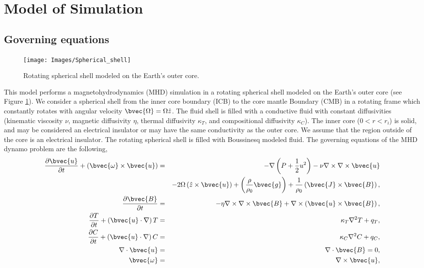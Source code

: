 \section{Model of Simulation}
\subsection{Governing equations}
%
\begin{figure}[htbp]
\begin{center}
\texttt{[image: Images/Spherical\_shell]}
\end{center}
\caption{Rotating spherical shell modeled on the Earth's outer core.}
\label{fig:shell}
\end{figure}
%
This model performs a magnetohydrodynamics (MHD) simulation in a rotating spherical shell modeled on the Earth's outer core (see Figure \ref{fig:shell}). We consider a spherical shell from the inner core boundary (ICB) to the core mantle Boundary (CMB) in a rotating frame which constantly rotates with angular velocity $\bvec{\Omega} = \Omega \hat{z}$. The fluid shell is filled with a conductive fluid with constant diffusivities (kinematic viscosity $\nu$, magnetic diffusivity $\eta$, thermal diffusivity $\kappa_{T}$, and compositional diffusivity $\kappa_{C}$). The inner core ($0 < r < r_{i}$) is solid, and may be considered an electrical insulator  or may have the same conductivity as the outer core. We assume that the region outside of the core is an electrical insulator. The rotating spherical shell is filled with Boussinesq modeled fluid. The governing equations of the MHD dynamo problem are the following,
%
\begin{eqnarray}
\frac{\partial \bvec{u}}{\partial t} + \left(\bvec{\omega} \times \bvec{u}\right)
 & = & - \nabla \left(P+\frac{1}{2}u^{2} \right) -\nu \nabla \times \nabla \times \bvec{u}
\nonumber \\
 & &  - 2 \Omega \left(\hat{z} \times \bvec{u} \right)
     + \left( \frac{\rho}{\rho_{0}} \bvec{g} \right)
     + \frac{1}{\rho_{0}} \left(\bvec{J} \times \bvec{B} \right),
\nonumber \\
 \frac{\partial \bvec{B}}{\partial t}
 & = & -\eta \nabla \times \nabla \times \bvec{B}
       + \nabla \times \left(\bvec{u} \times \bvec{B} \right),
\nonumber \\
\frac{\partial T}{\partial t} + \left(\bvec{u} \cdot \nabla \right) T
 & = & \kappa_{T} \nabla^{2} T + q_{T},
\nonumber \\
\frac{\partial C}{\partial t} + \left(\bvec{u} \cdot \nabla \right) C
 & = & \kappa_{C} \nabla^{2} C + q_{C},
\nonumber \\
\nabla \cdot \bvec{u} & = & \nabla \cdot \bvec{B} = 0,
\label{eq:conservation}
\nonumber \\
\bvec{\omega} & = & \nabla \times \bvec{u},
\nonumber
\end{eqnarray}
